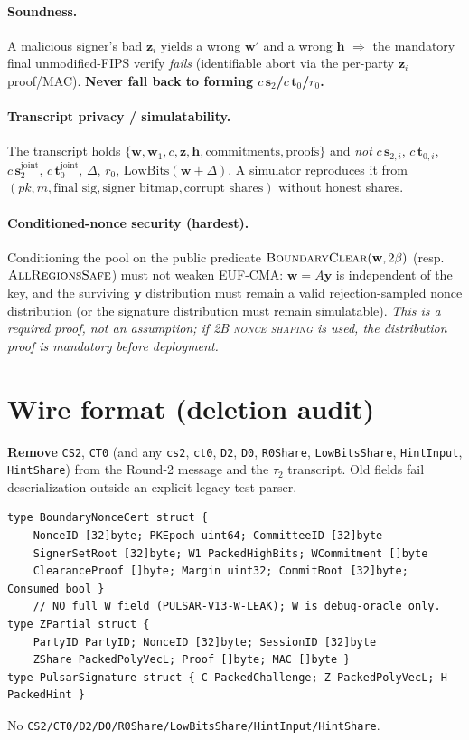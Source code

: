 \documentclass[11pt]{article}
\theoremstyle{remark}\newtheorem{remark}{Remark}
\begin{document}
\paragraph{Soundness.} A malicious signer's bad $\mathbf z_i$ yields a
wrong $\mathbf w'$ and a wrong $\mathbf h$ $\Rightarrow$ the mandatory
final unmodified-FIPS verify \emph{fails} (identifiable abort via the
per-party $\mathbf z_i$ proof/MAC). \textbf{Never fall back to forming
$c\,\mathbf s_2$/$c\,\mathbf t_0$/$r_0$.}
\paragraph{Transcript privacy / simulatability.} The transcript holds
$\{\mathbf w,\mathbf w_1,c,\mathbf z,\mathbf h,\text{commitments},
\text{proofs}\}$ and \emph{not} $c\,\mathbf s_{2,i}$, $c\,\mathbf
t_{0,i}$, $c\,\mathbf s_2^{\mathrm{joint}}$, $c\,\mathbf
t_0^{\mathrm{joint}}$, $\Delta$, $r_0$, $\mathrm{LowBits}(\mathbf
w{+}\Delta)$. A simulator reproduces it from $(pk, m, \text{final sig},
\text{signer bitmap}, \text{corrupt shares})$ without honest shares.
\paragraph{Conditioned-nonce security (hardest).} Conditioning the pool on
the public predicate $\textsc{BoundaryClear}(\mathbf w, 2\beta)$ (resp.\
$\textsc{AllRegionsSafe}$) must not weaken EUF-CMA: $\mathbf w = A\mathbf
y$ is independent of the key, and the surviving $\mathbf y$ distribution
must remain a valid rejection-sampled nonce distribution (or the signature
distribution must remain simulatable). \emph{This is a required proof, not
an assumption; if \textsc{2B nonce shaping} is used, the distribution
proof is mandatory before deployment.}

\section{Wire format (deletion audit)}
\textbf{Remove} \texttt{CS2}, \texttt{CT0} (and any \texttt{cs2},
\texttt{ct0}, \texttt{D2}, \texttt{D0}, \texttt{R0Share},
\texttt{LowBitsShare}, \texttt{HintInput}, \texttt{HintShare}) from the
Round-2 message and the $\tau_2$ transcript. Old fields fail
deserialization outside an explicit legacy-test parser.
\begin{verbatim}
type BoundaryNonceCert struct {
    NonceID [32]byte; PKEpoch uint64; CommitteeID [32]byte
    SignerSetRoot [32]byte; W1 PackedHighBits; WCommitment []byte
    ClearanceProof []byte; Margin uint32; CommitRoot [32]byte; Consumed bool }
    // NO full W field (PULSAR-V13-W-LEAK); W is debug-oracle only.
type ZPartial struct {
    PartyID PartyID; NonceID [32]byte; SessionID [32]byte
    ZShare PackedPolyVecL; Proof []byte; MAC []byte }
type PulsarSignature struct { C PackedChallenge; Z PackedPolyVecL; H PackedHint }
\end{verbatim}
No \texttt{CS2/CT0/D2/D0/R0Share/LowBitsShare/HintInput/HintShare}.
\end{document}

